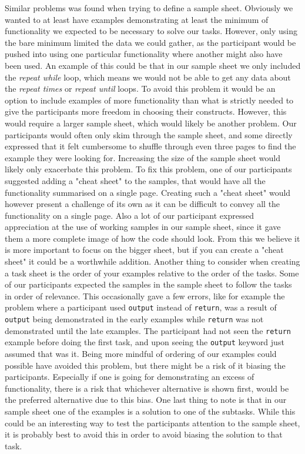 Similar problems was found when trying to define a sample sheet.
Obviously we wanted to at least have examples demonstrating at least the minimum of functionality we expected to be necessary to solve our tasks.
However, only using the bare minimum limited the data we could gather, as the participant would be pushed into using one particular functionality where another might also have been used.
An example of this could be that in our sample sheet we only included the \textit{repeat while} loop, which means we would not be able to get any data about the \textit{repeat times} or \textit{repeat until} loops.
To avoid this problem it would be an option to include examples of more functionality than what is strictly needed to give the participants more freedom in choosing their constructs.
However, this would require a larger sample sheet, which would likely be another problem.
Our participants would often only skim through the sample sheet, and some directly expressed that it felt cumbersome to shuffle through even three pages to find the example they were looking for.
Increasing the size of the sample sheet would likely only exacerbate this problem.
To fix this problem, one of our participants suggested adding a "cheat sheet" to the samples, that would have all the functionality summarised on a single page.
Creating such a "cheat sheet" would however present a challenge of its own as it can be difficult to convey all the functionality on a single page.
Also a lot of our participant expressed appreciation at the use of working samples in our sample sheet, since it gave them a more complete image of how the code should look.
From this we believe it is more important to focus on the bigger sheet, but if you can create a "cheat sheet" it could be a worthwhile addition.
Another thing to consider when creating a task sheet is the order of your examples relative to the order of the tasks.
Some of our participants expected the samples in the sample sheet to follow the tasks in order of relevance.
This occasionally gave a few errors, like for example the problem where a participant used \lstinline!output! instead of \lstinline!return!, was a result of \lstinline!output! being demonstrated in the early examples while \lstinline!return! was not demonstrated until the late examples.
The participant had not seen the \lstinline!return! example before doing the first task, and upon seeing the \lstinline!output! keyword just assumed that was it.
Being more mindful of ordering of our examples could possible have avoided this problem, but there might be a risk of it biasing the participants.
Especially if one is going for demonstrating an excess of functionality, there is a risk that whichever alternative is shown first, would be the preferred alternative due to this bias.
One last thing to note is that in our sample sheet one of the examples is a solution to one of the subtasks.
While this could be an interesting way to test the participants attention to the sample sheet, it is probably best to avoid this in order to avoid biasing the solution to that task.